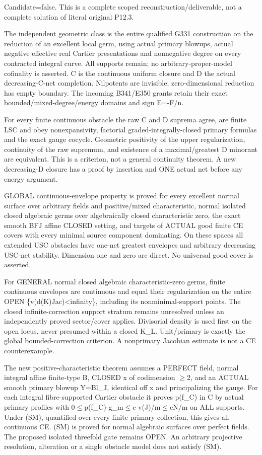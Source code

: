 \documentclass[11pt]{article}
\begin{document}
Candidate=false. This is a complete scoped reconstruction/deliverable, not a complete solution of literal original P12.3.

The independent geometric class is the entire qualified G331 construction on the reduction of an excellent local germ, using actual primary blowups, actual negative effective real Cartier presentations and nonnegative degree on every contracted integral curve. All supports remain; no arbitrary-proper-model cofinality is asserted. C is the continuous uniform closure and D the actual decreasing-C-net completion. Nilpotents are invisible; zero-dimensional reduction has empty boundary. The incoming B341/E350 grants retain their exact bounded/mixed-degree/energy domains and sign E=-F/n.

For every finite continuous obstacle the raw C and D suprema agree, are finite LSC and obey nonexpansivity, factorial graded-integrally-closed primary formulas and the exact gauge cocycle. Geometric positivity of the upper regularization, continuity of the raw supremum, and existence of a maximal/greatest D minorant are equivalent. This is a criterion, not a general continuity theorem. A new decreasing-D closure has a proof by insertion and ONE actual net before any energy argument.

GLOBAL continuous-envelope property is proved for every excellent normal surface over arbitrary fields and positive/mixed characteristic, normal isolated closed algebraic germs over algebraically closed characteristic zero, the exact smooth BFJ affine CLOSED setting, and targets of ACTUAL good finite CE covers with every minimal source component dominating. On these spaces all extended USC obstacles have one-net greatest envelopes and arbitrary decreasing USC-net stability. Dimension one and zero are direct. No universal good cover is asserted.

For GENERAL normal closed algebraic characteristic-zero germs, finite continuous envelopes are continuous and equal their regularization on the entire OPEN \{v(d(K)Jac)<infinity\}, including its nonminimal-support points. The closed infinite-correction support stratum remains unresolved unless an independently proved sector/cover applies. Divisorial density is used first on the open locus, never presumed within a closed K\_L. Unit/primary is exactly the global bounded-correction criterion. A nonprimary Jacobian estimate is not a CE counterexample.

The new positive-characteristic theorem assumes a PERFECT field, normal integral affine finite-type B, CLOSED x of codimension \ensuremath{\geq}2, and an ACTUAL smooth primary blowup Y=Bl\_J, identical off x and principalizing the gauge. For each integral fibre-supported Cartier obstacle it proves p(f\_C) in C by actual primary profiles with 0\ensuremath{\leq}p(f\_C)-g\_m\ensuremath{\leq}c v(J)/m\ensuremath{\leq}cN/m on ALL supports. Under (SM), quantified over every finite primary collection, this gives all-continuous CE. (SM) is proved for normal algebraic surfaces over perfect fields. The proposed isolated threefold gate remains OPEN. An arbitrary projective resolution, alteration or a single obstacle model does not satisfy (SM).
\end{document}
